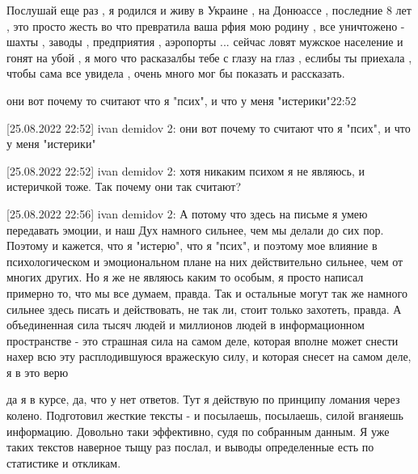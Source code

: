 Послушай еще раз , я родился и живу в Украине , на Донюассе , последние 8 лет ,
это просто жесть во что превратила ваша рфия мою родину , все уничтожено -
шахты , заводы , предприятия , аэропорты ... сейчас ловят мужское население и
гонят на убой , я мого что расказалбы тебе с глазу на глаз , еслибы ты приехала
, чтобы сама все увидела , очень много мог бы показать и рассказать.

они вот почему то считают что я "псих", и что у меня "истерики"22:52

[25.08.2022 22:52] ivan demidov 2: они вот почему то считают что я "псих", и
что у меня "истерики"

[25.08.2022 22:52] ivan demidov 2: хотя никаким психом я не являюсь, и
истеричкой тоже. Так почему они так считают?

[25.08.2022 22:56] ivan demidov 2: А потому что здесь на письме я умею
передавать эмоции, и наш Дух намного сильнее, чем мы делали до сих пор. Поэтому
и кажется, что я "истерю", что я "псих", и поэтому мое влияние в
психологическом и эмоциональном плане на них действительно сильнее, чем от
многих других. Но я же не являюсь каким то особым, я просто написал примерно
то, что мы все думаем, правда. Так и остальные могут так же намного сильнее
здесь писать и действовать, не так ли, стоит только захотеть, правда. А
объединенная сила тысяч людей и миллионов людей в информационном пространстве -
это страшная сила на самом деле, которая вполне может снести нахер всю эту
расплодившуюся вражескую силу, и которая снесет на самом деле, я в это верю



да я в курсе, да, что у нет ответов. Тут я действую по принципу ломания через
колено. Подготовил жесткие тексты - и посылаешь, посылаешь, силой вганяешь
информацию. Довольно таки эффективно, судя по собранным данным. Я уже таких
текстов наверное тыщу раз послал, и выводы определенные есть по статистике и
откликам.


